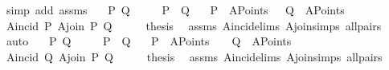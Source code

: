\begin{isabellebody}
\ {\isacharparenleft}{\kern0pt}simp\ add{\isacharcolon}{\kern0pt}\ assms{\isacharparenleft}{\kern0pt}{}{\isacharparenright}{\kern0pt}{\isacharparenright}{\kern0pt}\isanewline
{}\isamarkupfalse%
%
\endisatagproof
{\isafoldproof}%
%
\isadelimproof
\isanewline
%
\endisadelimproof
\isanewline
{}\isamarkupfalse%
\isanewline
\ \ \ P\ Q\isanewline
\ \ \ \ \ {\isachardoublequoteopen}P\ {\isasymnoteq}\ Q{\isachardoublequoteclose}\ \isanewline
\ \ {\isachardoublequoteopen}P\ {\isasymin}\ A{}Points{\isachardoublequoteclose}\ \ \ {\isachardoublequoteopen}Q\ {\isasymin}\ A{}Points{\isachardoublequoteclose}\isanewline
{}\ {\isachardoublequoteopen}A{}incid\ P\ {\isacharparenleft}{\kern0pt}A{}join\ P\ Q{\isacharparenright}{\kern0pt}{\isachardoublequoteclose}\isanewline
%
\isadelimproof
%
\endisadelimproof
%
\isatagproof
{}\isamarkupfalse%
\ {\isacharminus}{\kern0pt}\isanewline
\ \ \isamarkupfalse%
\ {\isacharquery}{\kern0pt}thesis\ \isamarkupfalse%
\ assms\ A{}incid{\isachardot}{\kern0pt}elims\ A{}join{\isachardot}{\kern0pt}simps\ all{\isacharunderscore}{\kern0pt}pairs\ \isamarkupfalse%
\ auto\isanewline
{}\isamarkupfalse%
%
\endisatagproof
{\isafoldproof}%
%
\isadelimproof
\isanewline
%
\endisadelimproof
\isanewline
{}\isamarkupfalse%
\isanewline
\ \ \ P\ Q\isanewline
\ \ \ \ \ {\isachardoublequoteopen}P\ {\isasymnoteq}\ Q{\isachardoublequoteclose}\ \isanewline
\ {\isachardoublequoteopen}\ P\ {\isasymin}\ A{}Points{\isachardoublequoteclose}\ \ \ {\isachardoublequoteopen}\ Q\ {\isasymin}\ A{}Points{\isachardoublequoteclose}\isanewline
{}\ {\isachardoublequoteopen}A{}incid\ Q\ {\isacharparenleft}{\kern0pt}A{}join\ P\ Q{\isacharparenright}{\kern0pt}{\isachardoublequoteclose}\isanewline
%
\isadelimproof
%
\endisadelimproof
%
\isatagproof
{}\isamarkupfalse%
\ {\isacharminus}{\kern0pt}\isanewline
\ \ \isamarkupfalse%
\ {\isacharquery}{\kern0pt}thesis\ \isamarkupfalse%
\ assms\ A{}incid{\isachardot}{\kern0pt}elims\ A{}join{\isachardot}{\kern0pt}simps\ all{\isacharunderscore}{\kern0pt}pairs\ \isamarkupfalse%

\end{isabellebody}
